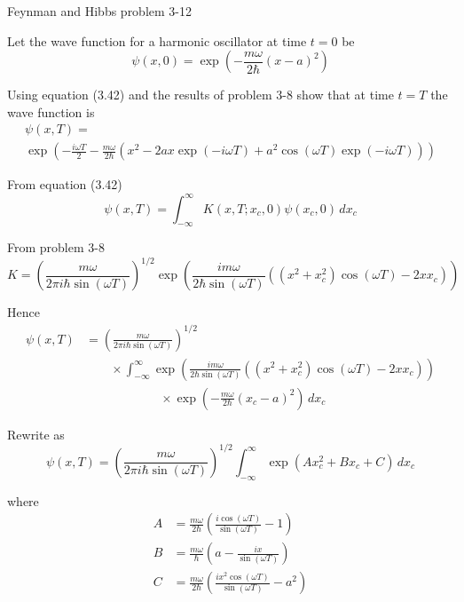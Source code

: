 \documentclass[12pt]{article}
\begin{document}
Feynman and Hibbs problem 3-12

\bigskip
Let the wave function for a harmonic oscillator at time $t=0$ be
\begin{equation*}
\psi(x,0)=\exp\left(-\frac{m\omega}{2\hbar}(x-a)^2\right)
\end{equation*}

Using equation (3.42) and the results of problem 3-8 show that
at time $t=T$ the wave function is
\begin{multline*}
\psi(x,T)=
\\
\exp\left(
-\frac{i\omega T}{2}-\frac{m\omega}{2\hbar}
\left(x^2-2ax\exp(-i\omega T)+a^2\cos(\omega T)\exp(-i\omega T)\right)
\right)
\end{multline*}

From equation (3.42)
\begin{equation*}
\psi(x,T)=\int_{-\infty}^\infty K(x,T;x_c,0)\psi(x_c,0)\,dx_c
\end{equation*}

From problem 3-8
\begin{equation*}
K=\left(\frac{m\omega}{2\pi i\hbar\sin(\omega T)}\right)^{1/2}
\exp\left(
\frac{im\omega}{2\hbar\sin(\omega T)}\left((x^2+x_c^2)\cos(\omega T)-2xx_c\right)
\right)
\end{equation*}

Hence
\begin{align*}
\psi(x,T)&=\left(\frac{m\omega}{2\pi i\hbar\sin(\omega T)}\right)^{1/2}
\\
&\qquad{}\times
\int_{-\infty}^\infty \exp\left(
\frac{im\omega}{2\hbar\sin(\omega T)}\left((x^2+x_c^2)\cos(\omega T)-2xx_c\right)
\right)
\\
&\qquad\qquad\qquad{}\times
\exp\left(-\frac{m\omega}{2\hbar}(x_c-a)^2\right)\,dx_c
\end{align*}

Rewrite as
\begin{equation*}
\psi(x,T)=\left(\frac{m\omega}{2\pi i\hbar\sin(\omega T)}\right)^{1/2}
\int_{-\infty}^\infty\exp(Ax_c^2+Bx_c+C)\,dx_c
\tag{1}
\end{equation*}

where
\begin{align*}
A&=\frac{m\omega}{2\hbar}\left(\frac{i\cos(\omega T)}{\sin(\omega T)}-1\right)
\\
B&=\frac{m\omega}{\hbar}\left(a-\frac{ix}{\sin(\omega T)}\right)
\\
C&=\frac{m\omega}{2\hbar}\left(\frac{ix^2\cos(\omega T)}{\sin(\omega T)}-a^2\right)
\end{align*}
\end{document}
